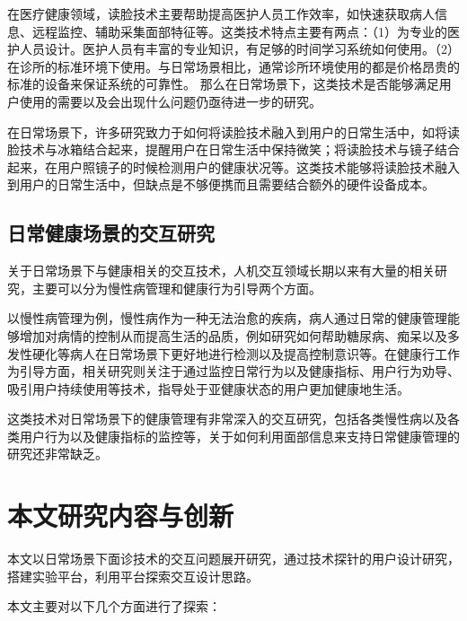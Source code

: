 在医疗健康领域，读脸技术主要帮助提高医护人员工作效率，如快速获取病人信息\cite{nwosu2016mobile}、远程监控\cite{Hossain2015Cloud}、辅助采集面部特征\cite{张红凯2015中医面诊信息采集与识别方法研究进展}等。这类技术特点主要有两点：（1）为专业的医护人员设计。医护人员有丰富的专业知识，有足够的时间学习系统如何使用。（2）在诊所的标准环境下使用。与日常场景相比，通常诊所环境使用的都是价格昂贵的标准的设备来保证系统的可靠性。
那么在日常场景下，这类技术是否能够满足用户使用的需要以及会出现什么问题仍亟待进一步的研究。

在日常场景下，许多研究致力于如何将读脸技术融入到用户的日常生活中，如将读脸技术与冰箱结合起来，提醒用户在日常生活中保持微笑\cite{Tsujita2011Smiling}；将读脸技术与镜子结合起来，在用户照镜子的时候检测用户的健康状况\cite{andreu2015mirror}等。这类技术能够将读脸技术融入到用户的日常生活中，但缺点是不够便携而且需要结合额外的硬件设备成本。

\subsection{日常健康场景的交互研究}
关于日常场景下与健康相关的交互技术，人机交互领域长期以来有大量的相关研究，主要可以分为慢性病管理和健康行为引导两个方面。

以慢性病管理为例，慢性病作为一种无法治愈的疾病，病人通过日常的健康管理能够增加对病情的控制从而提高生活的品质，例如研究如何帮助糖尿病\cite{mamykina2008mahi}、痴呆\cite{yasuda2009remote}以及多发性硬化\cite{ayobi2017quantifying}等病人在日常场景下更好地进行检测以及提高控制意识等。在健康行工作为引导方面，相关研究则关注于通过监控日常行为\cite{purpura2011fit4life,Inagawa2013A,bravata2007using,cordeiro2015barriers,lin2006fish, miller2014stepstream}以及健康指标\cite{kay2012lullaby,gronvall2013beyond,logan2007mobile,walters2010a}、用户行为劝导、吸引用户持续使用等技术，指导处于亚健康状态的用户更加健康地生活。

这类技术对日常场景下的健康管理有非常深入的交互研究，包括各类慢性病以及各类用户行为以及健康指标的监控等，关于如何利用面部信息来支持日常健康管理的研究还非常缺乏。

\section{本文研究内容与创新}

本文以日常场景下面诊技术的交互问题展开研究，通过技术探针的用户设计研究，搭建实验平台，利用平台探索交互设计思路。

本文主要对以下几个方面进行了探索：

